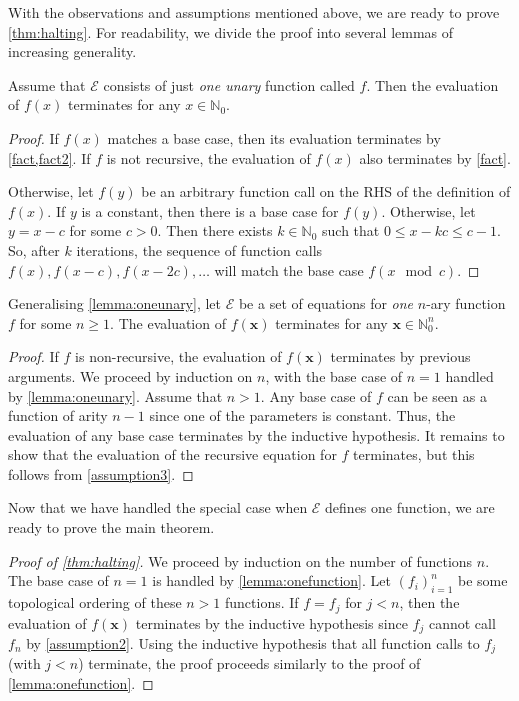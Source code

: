 \documentclass[a4paper,UKenglish,cleveref,autoref,table]{lipics-v2021}
\begin{document}
With the observations and assumptions mentioned above, we are ready to prove
\cref{thm:halting}. For readability, we divide the proof into several lemmas of
increasing generality.

\begin{lemma}\label{lemma:oneunary}
  Assume that $\mathcal{E}$ consists of just \emph{one unary} function called
  $f$. Then the evaluation of $f(x)$ terminates for any $x \in \mathbb{N}_{0}$.
\end{lemma}
\begin{proof}
  If $f(x)$ matches a base case, then its evaluation terminates by
  \cref{fact,fact2}. If $f$ is not recursive, the evaluation of $f(x)$ also
  terminates by \cref{fact}.

  Otherwise, let $f(y)$ be an arbitrary function call on the RHS of the
  definition of $f(x)$. If $y$ is a constant, then there is a base case for
  $f(y)$. Otherwise, let $y = x - c$ for some $c > 0$. Then there exists
  $k \in \mathbb{N}_{0}$ such that $0 \le x - kc \le c-1$. So, after $k$
  iterations, the sequence of function calls $f(x), f(x-c), f(x-2c),\dots$ will
  match the base case $f(x \mod c)$.
\end{proof}

\begin{lemma}\label{lemma:onefunction}
  Generalising \cref{lemma:oneunary}, let $\mathcal{E}$ be a set of equations
  for \emph{one} $n$-ary function $f$ for some $n \ge 1$. The evaluation of
  $f(\mathbf{x})$ terminates for any $\mathbf{x} \in \mathbb{N}_{0}^{n}$.
\end{lemma}
\begin{proof}
  If $f$ is non-recursive, the evaluation of $f(\mathbf{x})$ terminates by
  previous arguments. We proceed by induction on $n$, with the base case of
  $n=1$ handled by \cref{lemma:oneunary}. Assume that $n > 1$. Any base case of
  $f$ can be seen as a function of arity $n-1$ since one of the parameters is
  constant. Thus, the evaluation of any base case terminates by the inductive
  hypothesis. It remains to show that the evaluation of the recursive equation
  for $f$ terminates, but this follows from \cref{assumption3}.
\end{proof}

Now that we have handled the special case when $\mathcal{E}$ defines one
function, we are ready to prove the main theorem.

\begin{proof}[Proof of \cref{thm:halting}]
  We proceed by induction on the number of functions $n$. The base case of $n=1$
  is handled by \cref{lemma:onefunction}. Let ${(f_{i})}_{i=1}^{n}$ be some
  topological ordering of these $n > 1$ functions. If $f = f_{j}$ for $j < n$,
  then the evaluation of $f(\mathbf{x})$ terminates by the inductive hypothesis
  since $f_{j}$ cannot call $f_{n}$ by \cref{assumption2}. Using the inductive
  hypothesis that all function calls to $f_{j}$ (with $j < n$) terminate, the
  proof proceeds similarly to the proof of \cref{lemma:onefunction}.
\end{proof}
\end{document}
